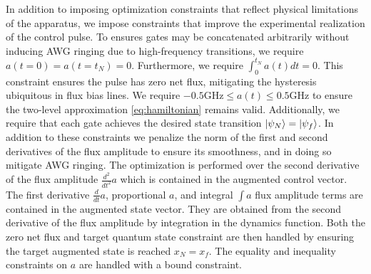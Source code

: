 \documentclass[
  amsfonts,
  amsmath,
  tbtags,
  amssymb,
  aps,
  nobibnotes,
  twocolumn,
  superscriptaddress,
]{revtex4-2}
\begin{document}
In addition to imposing optimization constraints that
reflect physical limitations of the apparatus, we impose
constraints that improve the experimental realization of the control pulse.
To ensures gates may be concatenated arbitrarily without
inducing AWG ringing due to high-frequency transitions,
we require $a(t = 0) = a(t = t_{N}) = 0$.
Furthermore, we require $\int_{0}^{t_{N}} a(t) dt = 0$. This
constraint ensures the pulse has zero net flux, mitigating
the hysteresis ubiquitous in flux bias lines.
We require $-0.5 \textrm{GHz} \le a(t) \le 0.5 \textrm{GHz}$
to ensure the two-level approximation \ref{eq:hamiltonian}
remains valid. Additionally, we require that each gate achieves
the desired state transition $\ket{\psi_{N}} = \ket{\psi_{f}}$.
In addition to these constraints we penalize the norm
of the first and second derivatives of the flux amplitude to
ensure its smoothness, and in doing so mitigate AWG ringing.
The optimization is performed over the second derivative of the flux amplitude
$\frac{d^{2}}{dt^{2}} a$ which is contained in the
augmented control vector. The first derivative
$\frac{d}{dt} a$, proportional $a$, and integral $\int a$
flux amplitude terms
are contained in the augmented state vector. They are obtained from
the second derivative of the flux amplitude by
integration in the dynamics function.
Both the zero net flux and target quantum state constraint
are then handled by ensuring the target augmented state is
reached $x_{N} = x_{f}$.
The equality and inequality constraints on $a$ are handled
with a bound constraint.
\end{document}
